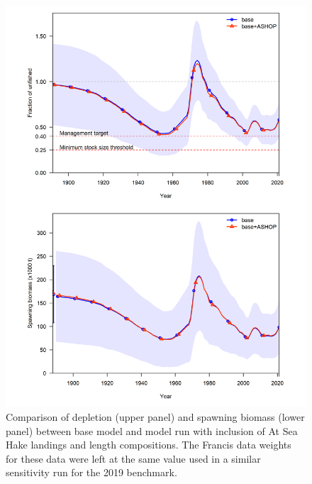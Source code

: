 \documentclass[11pt,
  english,
  a4paper,
]{article}
\begin{document}
\tagmcend\tagstructend


\begin{figure}
\centering
\includegraphics[width=1\textwidth,height=1\textheight]{figs/ashop_sens.png}
\caption{Comparison of depletion (upper panel) and spawning biomass (lower panel) between base model and model run with inclusion of At Sea Hake landings and length compositions. The Francis data weights for these data were left at the same value used in a similar sensitivity run for the 2019 benchmark. \label{fig:ASHOP}}
\end{figure}

\tagmcend\tagstructend

\end{document}
